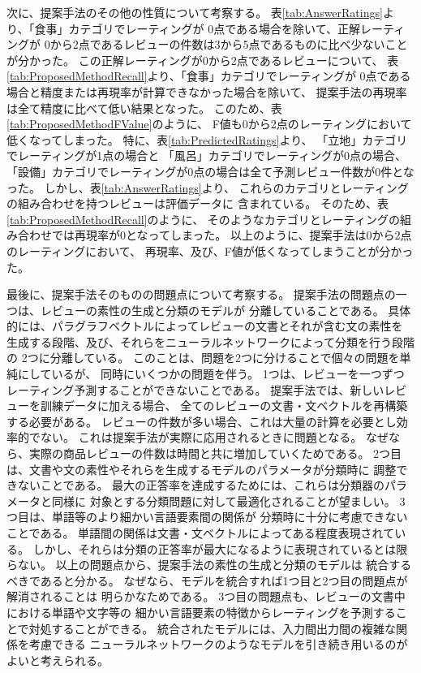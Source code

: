 次に、提案手法のその他の性質について考察する。
%
表\ref{tab:AnswerRatings}より、「食事」カテゴリでレーティングが
0点である場合を除いて、正解レーティングが
0から2点であるレビューの件数は3から5点であるものに比べ少ないことが分かった。
この正解レーティングが0から2点であるレビューについて、
表\ref{tab:ProposedMethodRecall}より、「食事」カテゴリでレーティングが
0点である場合と精度または再現率が計算できなかった場合を除いて、
提案手法の再現率は全て精度に比べて低い結果となった。
このため、表\ref{tab:ProposedMethodFValue}のように、
F値も0から2点のレーティングにおいて低くなってしまった。
%
特に、表\ref{tab:PredictedRatings}より、
「立地」カテゴリでレーティングが1点の場合と
「風呂」カテゴリでレーティングが0点の場合、
「設備」カテゴリでレーティングが0点の場合は全て予測レビュー件数が0件となった。
しかし、表\ref{tab:AnswerRatings}より、
これらのカテゴリとレーティングの組み合わせを持つレビューは評価データに
含まれている。
そのため、表\ref{tab:ProposedMethodRecall}のように、
そのようなカテゴリとレーティングの組み合わせでは再現率が0となってしまった。
%
以上のように、提案手法は0から2点のレーティングにおいて、
再現率、及び、F値が低くなってしまうことが分かった。

最後に、提案手法そのものの問題点について考察する。
提案手法の問題点の一つは、レビューの素性の生成と分類のモデルが
分離していることである。
具体的には、パラグラフベクトルによってレビューの文書とそれが含む文の素性を
生成する段階、及び、それらをニューラルネットワークによって分類を行う段階の
2つに分離している。
このことは、問題を2つに分けることで個々の問題を単純にしているが、
同時にいくつかの問題を伴う。
1つは、レビューを一つずつレーティング予測することができないことである。
提案手法では、新しいレビューを訓練データに加える場合、
全てのレビューの文書・文ベクトルを再構築する必要がある。
レビューの件数が多い場合、これは大量の計算を必要とし効率的でない。
これは提案手法が実際に応用されるときに問題となる。
なぜなら、実際の商品レビューの件数は時間と共に増加していくためである。
2つ目は、文書や文の素性やそれらを生成するモデルのパラメータが分類時に
調整できないことである。
最大の正答率を達成するためには、これらは分類器のパラメータと同様に
対象とする分類問題に対して最適化されることが望ましい。
3つ目は、単語等のより細かい言語要素間の関係が
分類時に十分に考慮できないことである。
単語間の関係は文書・文ベクトルによってある程度表現されている。
しかし、それらは分類の正答率が最大になるように表現されているとは限らない。
以上の問題点から、提案手法の素性の生成と分類のモデルは
統合するべきであると分かる。
なぜなら、モデルを統合すれば1つ目と2つ目の問題点が解消されることは
明らかなためである。
3つ目の問題点も、レビューの文書中における単語や文字等の
細かい言語要素の特徴からレーティングを予測することで対処することができる。
統合されたモデルには、入力間出力間の複雑な関係を考慮できる
ニューラルネットワークのようなモデルを引き続き用いるのがよいと考えられる。
